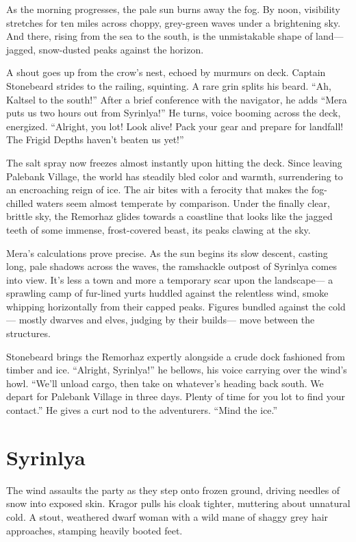 \documentclass[
  letterpaper,12pt,twoside,twocolumn,openany,
  nodeprecatedcode,bg=full]{dndbook}
\begin{document}
As the morning progresses, the pale sun burns away the fog. By noon,
visibility stretches for ten miles across choppy, grey-green waves under
a brightening sky. And there, rising from the sea to the south, is the
unmistakable shape of land--- jagged, snow-dusted peaks against the
horizon.

A shout goes up from the crow's nest, echoed by murmurs on deck. Captain
Stonebeard strides to the railing, squinting. A rare grin splits his
beard. ``Ah, Kaltsel to the south!'' After a brief conference with the
navigator, he adds ``Mera puts us two hours out from Syrinlya!'' He
turns, voice booming across the deck, energized. ``Alright, you lot!
Look alive! Pack your gear and prepare for landfall! The Frigid Depths
haven't beaten us yet!''

The salt spray now freezes almost instantly upon hitting the deck. Since
leaving Palebank Village, the world has steadily bled color and warmth,
surrendering to an encroaching reign of ice. The air bites with a
ferocity that makes the fog-chilled waters seem almost temperate by
comparison. Under the finally clear, brittle sky, the Remorhaz glides
towards a coastline that looks like the jagged teeth of some immense,
frost-covered beast, its peaks clawing at the sky.

Mera's calculations prove precise. As the sun begins its slow descent,
casting long, pale shadows across the waves, the ramshackle outpost of
Syrinlya comes into view. It's less a town and more a temporary scar
upon the landscape--- a sprawling camp of fur-lined yurts huddled
against the relentless wind, smoke whipping horizontally from their
capped peaks. Figures bundled against the cold--- mostly dwarves and
elves, judging by their builds--- move between the structures.

Stonebeard brings the Remorhaz expertly alongside a crude dock fashioned
from timber and ice. ``Alright, Syrinlya!'' he bellows, his voice
carrying over the wind's howl. ``We'll unload cargo, then take on
whatever's heading back south. We depart for Palebank Village in three
days. Plenty of time for you lot to find your contact.'' He gives a curt
nod to the adventurers. ``Mind the ice.''

\section{Syrinlya}\label{syrinlya}

The wind assaults the party as they step onto frozen ground, driving
needles of snow into exposed skin. Kragor pulls his cloak tighter,
muttering about unnatural cold. A stout, weathered dwarf woman with a
wild mane of shaggy grey hair approaches, stamping heavily booted feet.
\end{document}
